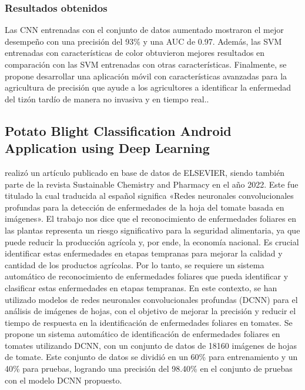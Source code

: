 \subsubsection{Resultados obtenidos}

Las CNN entrenadas con el conjunto de datos aumentado mostraron el mejor desempeño con una precisión del 93\% y una AUC de 0.97. Además, las SVM entrenadas con características de color obtuvieron mejores resultados en comparación con las SVM entrenadas con otras características. Finalmente, se propone desarrollar una aplicación móvil con características avanzadas para la agricultura de precisión que ayude a los agricultores a identificar la enfermedad del tizón tardío de manera no invasiva y en tiempo real..

\subsection{Potato Blight Classification Android Application using Deep Learning  \citep*{antecedente5}}

\citeauthor{antecedente5} realizó un artículo publicado en base de datos de ELSEVIER, siendo también parte de la revista Sustainable Chemistry and Pharmacy en el año 2022. Este fue titulado  la cual traducida al español significa «Redes neuronales convolucionales profundas para la detección de enfermedades de la hoja del tomate basada en imágenes». El trabajo nos dice que el reconocimiento de enfermedades foliares en las plantas representa un riesgo significativo para la seguridad alimentaria, ya que puede reducir la producción agrícola y, por ende, la economía nacional. Es crucial identificar estas enfermedades en etapas tempranas para mejorar la calidad y cantidad de los productos agrícolas. Por lo tanto, se requiere un sistema automático de reconocimiento de enfermedades foliares que pueda identificar y clasificar estas enfermedades en etapas tempranas. En este contexto, se han utilizado modelos de redes neuronales convolucionales profundas (DCNN) para el análisis de imágenes de hojas, con el objetivo de mejorar la precisión y reducir el tiempo de respuesta en la identificación de enfermedades foliares en tomates. Se propone un sistema automático de identificación de enfermedades foliares en tomates utilizando DCNN, con un conjunto de datos de 18160 imágenes de hojas de tomate. Este conjunto de datos se dividió en un 60\% para entrenamiento y un 40\% para pruebas, logrando una precisión del 98.40\% en el conjunto de pruebas con el modelo DCNN propuesto.

